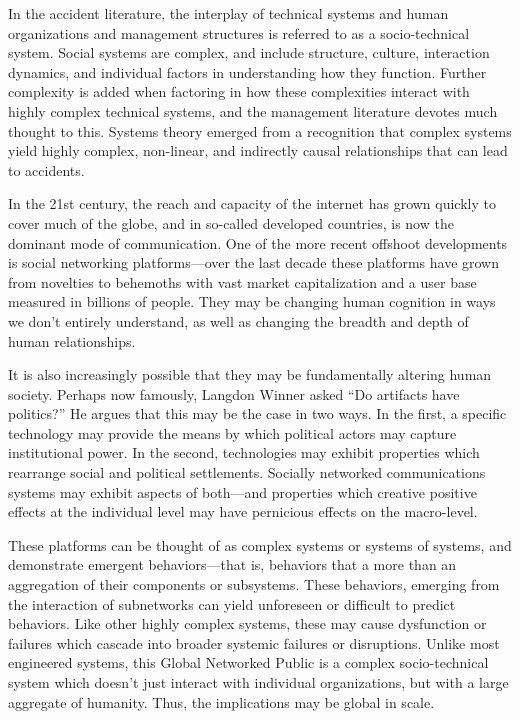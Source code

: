 \documentclass[10pt,twocolumn]{article}   	%
\begin{document}
In the accident literature, the interplay of technical systems and human
organizations and management structures is referred to as a
socio-technical system. Social systems are complex, and
include structure, culture, interaction dynamics, and individual factors
in understanding how they function. Further complexity is added when
factoring in how these complexities interact with highly complex
technical systems, and the management literature devotes much thought to
this. Systems theory emerged from a recognition that complex systems
yield highly complex, non-linear, and indirectly causal relationships
that can lead to accidents.\cite[p.13]{Marais}

In the 21st century, the reach and capacity of the internet has grown
quickly to cover much of the globe, and in so-called developed
countries, is now the dominant mode of communication. One of the more recent offshoot developments is social
networking platforms---over the last decade these platforms have grown
from novelties to behemoths with vast market capitalization and a user
base measured in billions of people. They may be changing human cognition in ways we don't entirely
understand, as well as changing the breadth and depth of human
relationships.

It is also increasingly possible that they may be fundamentally altering
human society. Perhaps now famously, Langdon Winner asked ``Do artifacts
have politics?'' He argues that this may be the case in two ways. In the
first, a specific technology may provide the means by which political
actors may capture institutional power. In the second, technologies may
exhibit properties which rearrange social and political
settlements.\cite{Winner1980} Socially networked communications systems
may exhibit aspects of both---and properties which creative positive
effects at the individual level may have pernicious effects on the
macro-level.

These platforms can be thought of as complex systems or systems of
systems, and demonstrate emergent behaviors---that is, behaviors that a
more than an aggregation of their components or subsystems.\cite[p.695.]{Haglich2010}
These behaviors, emerging from the interaction of subnetworks can yield
unforeseen or difficult to predict behaviors.\cite[p. p.693]{Haglich2010} Like other
highly complex systems, these may cause dysfunction or failures which
cascade into broader systemic failures or disruptions. Unlike most
engineered systems, this Global Networked Public is a complex
socio-technical system which doesn't just interact with individual
organizations, but with a large aggregate of humanity. Thus, the
implications may be global in scale.
\end{document}
